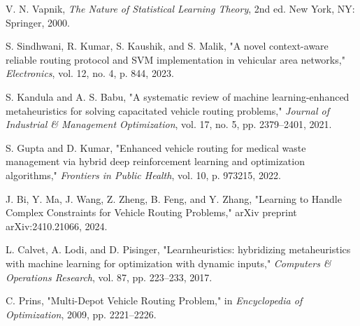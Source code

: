 \documentclass[conference]{IEEEtran} %
\begin{document}
\begin{thebibliography}{99}
V. N. Vapnik, \textit{The Nature of Statistical Learning Theory}, 2nd ed. New York, NY: Springer, 2000.

S. Sindhwani, R. Kumar, S. Kaushik, and S. Malik, "A novel context-aware reliable routing protocol and SVM implementation in vehicular area networks," \textit{Electronics}, vol. 12, no. 4, p. 844, 2023.

S. Kandula and A. S. Babu, "A systematic review of machine learning-enhanced metaheuristics for solving capacitated vehicle routing problems," \textit{Journal of Industrial & Management Optimization}, vol. 17, no. 5, pp. 2379--2401, 2021.

S. Gupta and D. Kumar, "Enhanced vehicle routing for medical waste management via hybrid deep reinforcement learning and optimization algorithms," \textit{Frontiers in Public Health}, vol. 10, p. 973215, 2022.

J. Bi, Y. Ma, J. Wang, Z. Zheng, B. Feng, and Y. Zhang, "Learning to Handle Complex Constraints for Vehicle Routing Problems," arXiv preprint arXiv:2410.21066, 2024.

L. Calvet, A. Lodi, and D. Pisinger, "Learnheuristics: hybridizing metaheuristics with machine learning for optimization with dynamic inputs," \textit{Computers & Operations Research}, vol. 87, pp. 223--233, 2017.

C. Prins, "Multi-Depot Vehicle Routing Problem," in \textit{Encyclopedia of Optimization}, 2009, pp. 2221--2226.

\end{thebibliography}
\end{document}
